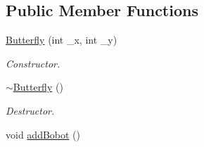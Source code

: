 \subsection*{Public Member Functions}
\begin{DoxyCompactItemize}
\item 
\hyperlink{classButterfly_aad74a900dcfae28b2f481e86148d6fad}{Butterfly} (int \-\_\-x, int \-\_\-y)
\begin{DoxyCompactList}\small\item\em Constructor. \end{DoxyCompactList}\item 
\hypertarget{classButterfly_aa6e58d14c62f35e6b4d8a84d4396d30e}{\hyperlink{classButterfly_aa6e58d14c62f35e6b4d8a84d4396d30e}{$\sim$\-Butterfly} ()}\label{classButterfly_aa6e58d14c62f35e6b4d8a84d4396d30e}

\begin{DoxyCompactList}\small\item\em Destructor. \end{DoxyCompactList}\item 
\hypertarget{classButterfly_ad1458d18e99f90979f20123cda50b6b3}{void \hyperlink{classButterfly_ad1458d18e99f90979f20123cda50b6b3}{add\-Bobot} ()}\label{classButterfly_ad1458d18e99f90979f20123cda50b6b3}


\end{DoxyCompactItemize}
